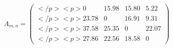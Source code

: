 \documentclass[12pt]{article}
\begin{document}
$ \begin{equation*}    A_{m,n} =     \begin{pmatrix}</p>
<p>0 &15.98 & 15.80& 5.22\\</p>
<p>23.78 & 0 &16.91 & 9.31 \\</p>
<p>37.58 & 25.35 & 0 & 22.07 \\</p>
<p>27.86 & 22.56 & 18.58 & 0    \end{pmatrix}\end{equation*} $
\end{document}
